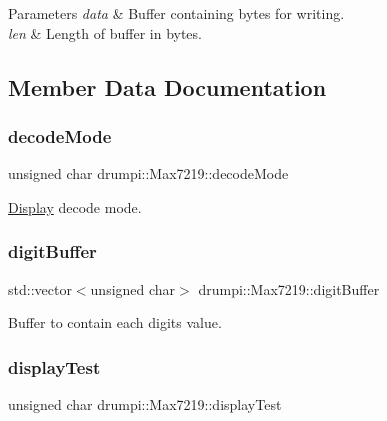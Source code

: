 \begin{DoxyParams}{Parameters}
{\em data} & Buffer containing bytes for writing. \\
\hline
{\em len} & Length of buffer in bytes. \\
\hline
\end{DoxyParams}


\subsection{Member Data Documentation}
\mbox{\label{classdrumpi_1_1Max7219_a7ba5a789cdd1120814595b89ba4e99e0}} 
\subsubsection{\texorpdfstring{decode\+Mode}{decodeMode}}
{\footnotesize\ttfamily unsigned char drumpi\+::\+Max7219\+::decode\+Mode\hspace{0.3cm}{\ttfamily [private]}}

\hyperlink{classdrumpi_1_1Display}{Display} decode mode. \mbox{\label{classdrumpi_1_1Max7219_ab26f32728dd82c00e39b6212436f291e}} 
\subsubsection{\texorpdfstring{digit\+Buffer}{digitBuffer}}
{\footnotesize\ttfamily std\+::vector$<$unsigned char$>$ drumpi\+::\+Max7219\+::digit\+Buffer\hspace{0.3cm}{\ttfamily [private]}}

Buffer to contain each digit\textquotesingle{}s value. \mbox{\label{classdrumpi_1_1Max7219_a203552d0f41ceb1366dbd8bbf1608110}} 
\subsubsection{\texorpdfstring{display\+Test}{displayTest}}
{\footnotesize\ttfamily unsigned char drumpi\+::\+Max7219\+::display\+Test\hspace{0.3cm}{\ttfamily [private]}}

